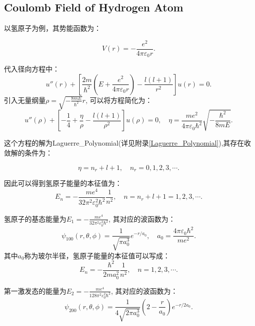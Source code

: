\subsection{Coulomb Field of Hydrogen Atom}
以氢原子为例，其势能函数为：

\begin{equation}
    V(r)=-\frac{e^2}{4\pi\varepsilon_0 r}.
\end{equation}

代入径向方程中：
\begin{equation}
    u''(r)+\left[\frac{2m}{\hbar^2}\left(E+\frac{e^2}{4\pi\varepsilon_0 r}\right)-\frac{l(l+1)}{r^2}\right]u(r)=0.
\end{equation}
引入无量纲量$\rho=\sqrt{-\frac{8mE}{\hbar^2}}r$, 可以将方程简化为：
\begin{equation}
    u''(\rho)+\left[-\frac{1}{4}+\frac{\eta}{\rho}-\frac{l(l+1)}{\rho^2}\right]u(\rho)=0, \quad \eta=\frac{me^2}{4\pi\varepsilon_0\hbar^2}\sqrt{-\frac{\hbar^2}{8mE}}.
\end{equation}

这个方程的解为\gls{Laguerre_Polynomial}(详见附录\ref{Laguerre_Polynomial}),其存在收敛解的条件为：

\begin{equation}
    \eta=n_r+l+1, \quad n_r=0,1,2,3,\cdots.
\end{equation}

因此可以得到氢原子能量的本征值为：
\begin{equation}
    E_n=-\frac{me^4}{32\pi^2\varepsilon_0^2\hbar^2}\frac{1}{n^2}, \quad n=n_r+l+1=1,2,3,\cdots.
\end{equation}

氢原子的基态能量为$E_1=-\frac{me^4}{32\pi^2\varepsilon_0^2\hbar^2}$, 其对应的波函数为：
\begin{equation}
    \psi_{100}(r,\theta,\phi)=\frac{1}{\sqrt{\pi a_0^3}}e^{-r/a_0}, \quad a_0=\frac{4\pi\varepsilon_0\hbar^2}{me^2}.
\end{equation}
其中$a_0$称为玻尔半径，氢原子能量的本征值可以写成：
\begin{equation}
    E_n=-\frac{\hbar^2}{2ma_0^2}\frac{1}{n^2}, \quad n=1,2,3,\cdots.
\end{equation}

第一激发态的能量为$E_2=-\frac{me^4}{128\pi^2\varepsilon_0^2\hbar^2}$, 其对应的波函数为：
\begin{equation}
    \psi_{200}(r,\theta,\phi)=\frac{1}{4\sqrt{2\pi a_0^3}}\left(2-\frac{r}{a_0}\right)e^{-r/2a_0}.
\end{equation}
